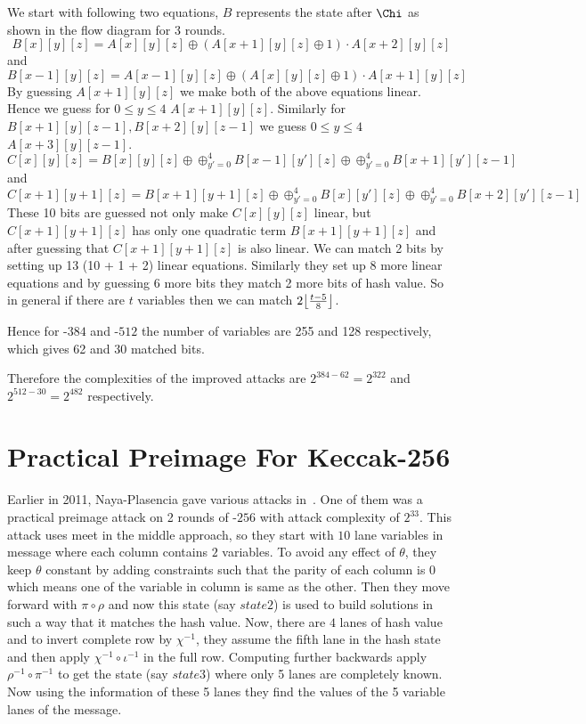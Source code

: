 		We start with following two equations, $B$ represents the state after $\Chi$ as shown in the flow diagram for 3 rounds.
		\[
			B[x][y][z] = A[x][y][z] \oplus (A[x+1][y][z] \oplus 1) \cdot A[x+2][y][z]
		\] and
		\[
			B[x-1][y][z] = A[x-1][y][z] \oplus (A[x][y][z] \oplus 1) \cdot A[x+1][y][z]
		\]
		By guessing $A[x+1][y][z]$ we make both of the above equations linear. Hence we guess for $0 \leq y \leq 4$ $A[x+1][y][z]$. Similarly for $B[x+1][y][z-1], B[x+2][y][z-1]$ we guess $0 \leq y \leq 4$ $A[x+3][y][z-1]$.
		\[
        C[x][y][z] = B[x][y][z] \oplus \oplus_{y' = 0}^{4} B[x-1][y'][z] \oplus \oplus_{y' = 0}^{4} B[x+1][y'][z-1]
    \] and 
		\[
        C[x+1][y+1][z] = B[x+1][y+1][z] \oplus \oplus_{y' = 0}^{4} B[x][y'][z] \oplus \oplus_{y' = 0}^{4} B[x+2][y'][z-1]
    \]
		These 10 bits are guessed not only make $C[x][y][z]$ linear, but $C[x+1][y+1][z]$ has only one quadratic term $B[x+1][y+1][z]$ and after guessing that $C[x+1][y+1][z]$ is also linear. We can match 2 bits by setting up 13 (10 + 1 + 2) linear equations. Similarly they set up 8 more linear equations and by guessing 6 more bits they match 2 more bits of hash value. So in general if there are $t$ variables then we can match $ 2\floor*{\frac{t-5}{8}}$.

		Hence for \KECCAK-$384$ and \KECCAK-$512$ the number of variables are 255 and 128 respectively, which gives 62 and 30 matched bits.
		
		Therefore the complexities of the improved attacks are $2^{384 - 62} = 2^{322}$ and $2^{512 - 30} = 2^{482}$ respectively.

\section{Practical Preimage For Keccak-256}

Earlier in 2011, Naya-Plasencia \etal gave various attacks in~\cite{naya2011practical}. One of them was a practical preimage attack on 2 rounds of \KECCAK-$256$ with attack complexity of $2^{33}$. This attack uses meet in the middle approach, so they start with $10$ lane variables in message where each column contains $2$ variables. To avoid any effect of $\theta$, they keep $\theta$ constant by adding constraints such that the parity of each column is $0$ which means one of the variable in column is same as the other. Then they move forward with $\pi \circ \rho$ and now this state (say $state2$) is used to build solutions in such a way that it matches the hash value. Now, there are $4$ lanes of hash value and to invert complete row by $\chi^{-1}$, they assume the fifth lane in the hash state and then apply $\chi^{-1} \circ \iota^{-1}$ in the full row. Computing further backwards apply $\rho^{-1} \circ \pi^{-1}$ to get the state (say $state3$) where only 5 lanes are completely known. Now using the information of these 5 lanes they find the values of the 5 variable lanes of the message.

